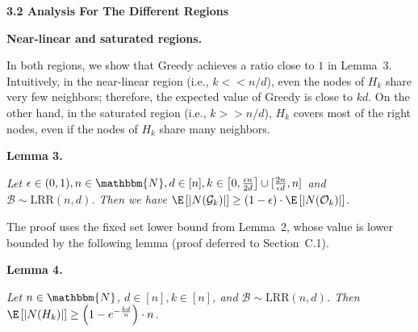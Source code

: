 \par\medskip\noindent\textbf{3.2 Analysis For The Different Regions}\par




\par\medskip\noindent\textbf{Near-linear and saturated regions.}\par




In both regions, we show that Greedy achieves a ratio close to $1$ in Lemma 3.
Intuitively, in the near-linear region (i.e., $k<<n/d$), even the nodes of $H_{k}$ share very few neighbors; therefore, the expected value of Greedy is close to $kd$. On the other hand, in the saturated region (i.e., $k>>n/d$), $H_{k}$ covers most of the right nodes, even if the nodes of $H_{k}$ share many neighbors.\par





\par\medskip\noindent\textbf{\textbf{Lemma 3}\textbf{.}}\par



\emph{Let $\epsilon\in(0,1),n\in\mathbbm{N},d\in[n],k\in\left[0,\frac{\epsilon n}{2d}\right]\cup[\frac{2n}{\epsilon d},n]$ and $\mathcal{B}\sim\text{{LRR}}(n,d)$.
Then we have $\E\left[|N(\mathcal{G}_{k})|\right]\geq\left(1-\epsilon\right)\cdot\E\left[|N(\mathcal{O}_{k})|\right]$.}\par






The proof uses the fixed set lower bound from Lemma 2, whose value is lower bounded by the following lemma (proof deferred to Section C.1).\par





\par\medskip\noindent\textbf{\textbf{Lemma 4}\textbf{.}}\par



\emph{Let $n\in\mathbbm{N}$, $d\in[n],k\in[n]$, and $\mathcal{B}\sim\text{{LRR}}(n,d)$.
Then $\E\left[|N(H_{k})|\right]\geq\left(1-e^{-\frac{kd}{n}}\right)\cdot n$.}\par



